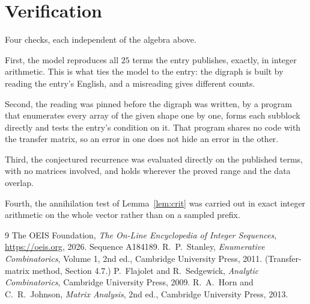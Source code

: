\documentclass[11pt,a4paper]{article}
\theoremstyle{plain}
\theoremstyle{definition}
\begin{document}
\section{Verification}

Four checks, each independent of the algebra above.

First, the model reproduces all $25$ terms the entry publishes, exactly, in integer
arithmetic. This is what ties the model to the entry: the digraph is built by reading the
entry's English, and a misreading gives different counts.

Second, the reading was pinned before the digraph was written, by a program that enumerates
every array of the given shape one by one, forms each subblock directly and tests the entry's
condition on it. That program shares no code with the transfer matrix, so an error in one does
not hide an error in the other.

Third, the conjectured recurrence was evaluated directly on the published terms, with no
matrices involved, and holds wherever the proved range and the data overlap.

Fourth, the annihilation test of Lemma~\ref{lem:crit} was carried out in exact integer
arithmetic on the whole vector rather than on a sampled prefix.

\begin{thebibliography}{9}
 The OEIS Foundation, \emph{The On-Line Encyclopedia of Integer
Sequences}, \url{https://oeis.org}, 2026. Sequence A184189.
 R.~P.~Stanley, \emph{Enumerative Combinatorics}, Volume 1, 2nd ed.,
Cambridge University Press, 2011. (Transfer-matrix method, Section 4.7.)
 P.~Flajolet and R.~Sedgewick, \emph{Analytic Combinatorics}, Cambridge
University Press, 2009.
 R.~A.~Horn and C.~R.~Johnson, \emph{Matrix Analysis}, 2nd ed., Cambridge
University Press, 2013.
\end{thebibliography}
\end{document}
